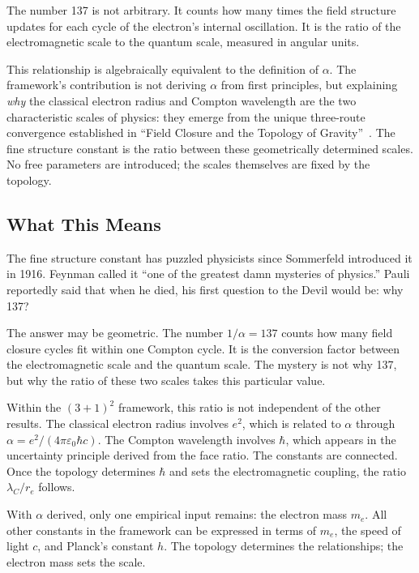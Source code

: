 \documentclass[aps,prd,preprint,superscriptaddress,showpacs,preprintnumbers,amsmath,amssymb,nofootinbib]{revtex4-2}
\begin{document}
The number 137 is not arbitrary. It counts how many times the field structure updates for each cycle of the electron's internal oscillation. It is the ratio of the electromagnetic scale to the quantum scale, measured in angular units.

This relationship is algebraically equivalent to the definition of $\alpha$. The framework's contribution is not deriving $\alpha$ from first principles, but explaining \emph{why} the classical electron radius and Compton wavelength are the two characteristic scales of physics: they emerge from the unique three-route convergence established in ``Field Closure and the Topology of Gravity''~\cite{paper5}. The fine structure constant is the ratio between these geometrically determined scales. No free parameters are introduced; the scales themselves are fixed by the topology.

\subsection{What This Means}
\label{subsec:alpha-meaning}

The fine structure constant has puzzled physicists since Sommerfeld introduced it in 1916. Feynman called it ``one of the greatest damn mysteries of physics.'' Pauli reportedly said that when he died, his first question to the Devil would be: why 137?

The answer may be geometric. The number $1/\alpha = 137$ counts how many field closure cycles fit within one Compton cycle. It is the conversion factor between the electromagnetic scale and the quantum scale. The mystery is not why 137, but why the ratio of these two scales takes this particular value.

Within the $(3+1)^2$ framework, this ratio is not independent of the other results. The classical electron radius involves $e^2$, which is related to $\alpha$ through $\alpha = e^2/(4\pi\varepsilon_0 \hbar c)$. The Compton wavelength involves $\hbar$, which appears in the uncertainty principle derived from the face ratio. The constants are connected. Once the topology determines $\hbar$ and sets the electromagnetic coupling, the ratio $\lambda_C/r_e$ follows.

With $\alpha$ derived, only one empirical input remains: the electron mass $m_e$. All other constants in the framework can be expressed in terms of $m_e$, the speed of light $c$, and Planck's constant $h$. The topology determines the relationships; the electron mass sets the scale.
\end{document}
